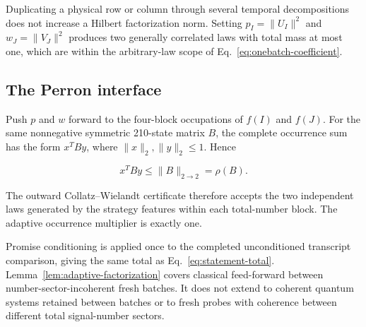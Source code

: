 Duplicating a physical row or column through several temporal decompositions does not increase a Hilbert factorization norm. Setting $p_I=\|U_I\|^2$ and $w_J=\|V_J\|^2$ produces two generally correlated laws with total mass at most one, which are within the arbitrary-law scope of Eq.~\eqref{eq:onebatch-coefficient}.

\subsection{The Perron interface}

Push $p$ and $w$ forward to the four-block occupations of $f(I)$ and $f(J)$. For the same nonnegative symmetric 210-state matrix $B$, the complete occurrence sum has the form $x^TBy$, where $\|x\|_2,\|y\|_2\le1$. Hence

\begin{equation}
x^TBy\le\|B\|_{2\to2}=\rho(B).
\end{equation}

The outward Collatz--Wielandt certificate therefore accepts the two independent laws generated by the strategy features within each total-number block. The adaptive occurrence multiplier is exactly one.

Promise conditioning is applied once to the completed unconditioned transcript comparison, giving the same total as Eq.~\eqref{eq:statement-total}. Lemma~\ref{lem:adaptive-factorization} covers classical feed-forward between number-sector-incoherent fresh batches. It does not extend to coherent quantum systems retained between batches or to fresh probes with coherence between different total signal-number sectors.
